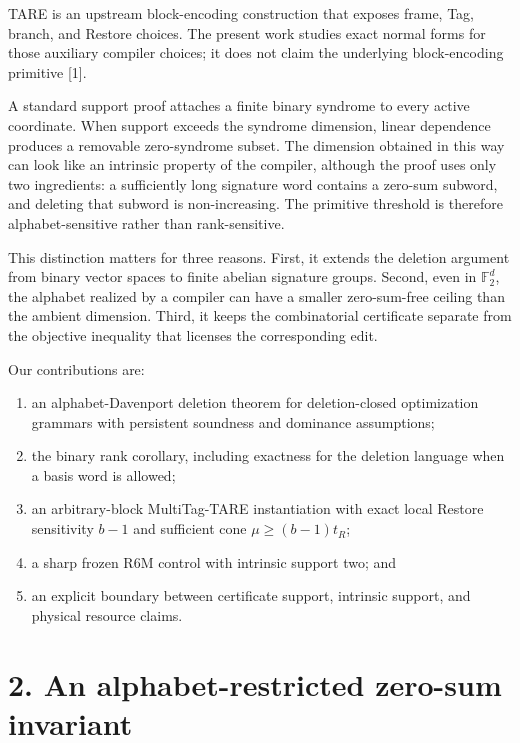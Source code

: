 \documentclass[
  11pt,
]{article}
\providecommand{\tightlist}{%
  \setlength{\itemsep}{0pt}\setlength{\parskip}{0pt}}
\begin{document}
TARE is an upstream block-encoding construction that exposes frame, Tag,
branch, and Restore choices. The present work studies exact normal forms
for those auxiliary compiler choices; it does not claim the underlying
block-encoding primitive {[}1{]}.

A standard support proof attaches a finite binary syndrome to every
active coordinate. When support exceeds the syndrome dimension, linear
dependence produces a removable zero-syndrome subset. The dimension
obtained in this way can look like an intrinsic property of the
compiler, although the proof uses only two ingredients: a sufficiently
long signature word contains a zero-sum subword, and deleting that
subword is non-increasing. The primitive threshold is therefore
alphabet-sensitive rather than rank-sensitive.

This distinction matters for three reasons. First, it extends the
deletion argument from binary vector spaces to finite abelian signature
groups. Second, even in \(\mathbb F_2^d\), the alphabet realized by a
compiler can have a smaller zero-sum-free ceiling than the ambient
dimension. Third, it keeps the combinatorial certificate separate from
the objective inequality that licenses the corresponding edit.

Our contributions are:

\begin{enumerate}
\def\labelenumi{\arabic{enumi}.}
\tightlist
\item
  an alphabet-Davenport deletion theorem for deletion-closed
  optimization grammars with persistent soundness and dominance
  assumptions;
\item
  the binary rank corollary, including exactness for the deletion
  language when a basis word is allowed;
\item
  an arbitrary-block MultiTag-TARE instantiation with exact local
  Restore sensitivity \(b-1\) and sufficient cone \(\mu\ge(b-1)t_R\);
\item
  a sharp frozen R6M control with intrinsic support two; and
\item
  an explicit boundary between certificate support, intrinsic support,
  and physical resource claims.
\end{enumerate}

\hypertarget{an-alphabet-restricted-zero-sum-invariant}{%
\section{2. An alphabet-restricted zero-sum
invariant}\label{an-alphabet-restricted-zero-sum-invariant}}
\end{document}
